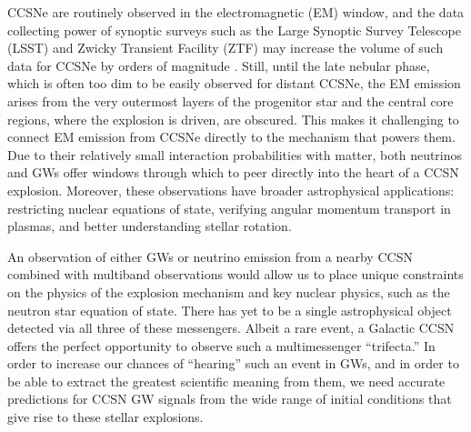 \documentclass[twocolumn,times]{aastex62}  %
\begin{document}
CCSNe are routinely observed in the electromagnetic (EM) window, and the data collecting power of synoptic surveys such as the Large Synoptic Survey Telescope (LSST) and Zwicky Transient Facility (ZTF) may increase the volume of such data for CCSNe by orders of magnitude \citep{ivezic:2008,bellm:2019}.
Still, until the late nebular phase, which is often too dim to be easily observed for distant CCSNe, the EM emission arises from the very outermost layers of the progenitor star and the central core regions, where the explosion is driven, are obscured. 
This makes it challenging to connect EM emission from CCSNe directly to the mechanism that powers them.
Due to their relatively small interaction probabilities with matter, both neutrinos and GWs offer windows through which to peer directly into the heart of a CCSN explosion.  
Moreover, these observations have broader astrophysical applications: restricting nuclear equations of state, verifying angular momentum transport in plasmas, and better understanding stellar rotation.

An observation of either GWs or neutrino emission from a nearby CCSN combined with multiband observations would allow us to place unique constraints on the physics of the explosion mechanism and key nuclear physics, such as the neutron star equation of state.  
There has yet to be a single astrophysical object detected via all three of these messengers.  
Albeit a rare event, a Galactic CCSN offers the perfect opportunity to observe such a multimessenger ``trifecta.''  
In order to increase our chances of ``hearing'' such an event in GWs, and in order to be able to extract the greatest scientific meaning from them, we need accurate predictions for CCSN GW signals from the wide range of initial conditions that give rise to these stellar explosions.
\end{document}
